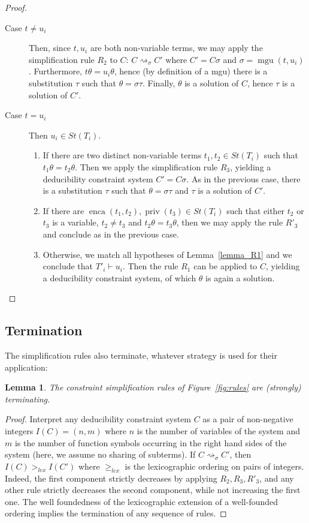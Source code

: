 \documentclass[acmtocl,acmnow]{acmtrans2m}
\newtheorem{lemma}[theorem]{Lemma}
\newcommand{\mgu}{\operatorname{mgu}}
\newcommand{\st}{\mathit{St}}
\newcommand{\enca}{\operatorname{enca}}
\newcommand{\priv}{\operatorname{priv}}
\newcommand{\simpl}{\rightsquigarrow}   \newcommand{\msimpl}{\rightsquigarrow}  \newcommand{\gsimpl}{\leadsto}
\newcommand{\dedsys}[1]{deducibility constraint system}
\begin{document}
\begin{proof}
\begin{description}
\begin{description}
\item[Case $t\neq u_i$] Then, since $t,u_i$ are both non-variable terms,
 we may apply the simplification rule $R_2$ to $C$: $C \simpl_\sigma C'$
where $C'=C\sigma$ and $\sigma = \mgu(t,u_i)$. Furthermore, $t\theta = u_i\theta$, hence (by definition of a mgu) there is a substitution $\tau$ such that
$\theta = \sigma\tau$. Finally, $\theta$ is a solution of $C$, hence $\tau$ is
a solution of $C'$.
\item[Case $t=u_i$] Then $u_i\in \st(T_i)$. 
\begin{enumerate}
\item\label{case_R3} If there are two distinct non-variable terms $t_1, t_2\in \st(T_i)$ such that
$t_1\theta=t_2\theta$. Then we
apply the simplification rule $R_3$, yielding a \dedsys{} $C'=C\sigma$.
As in the previous case, there is a substitution $\tau$ such that $\theta=\sigma\tau$ and $\tau$ is a solution of $C'$.
\item If there are $\enca(t_1,t_2), \priv(t_3)\in \st(T_i)$ such that
either $t_2$ or $t_3$ is a variable, $t_2\neq t_3$ and $t_2\theta=t_3\theta$,
then we may apply the rule $R'_3$ and conclude as in the previous case.
\item Otherwise, 
we match all hypotheses of Lemma~\ref{lemma_R1} and we conclude
that $T'_i \vdash u_i$. Then the rule $R_1$ can be applied to $C$,
yielding a \dedsys{}, of which $\theta$ is again a solution.
\end{enumerate}
\end{description}
\end{description}
\end{proof}

\subsection{Termination}
\label{section:termination}


The simplification rules also terminate, whatever strategy is used for
their application:
\begin{lemma}\label{lemma:termination}
The constraint simplification rules of Figure~\ref{fig:rules} are (strongly)
terminating.
\end{lemma}

\begin{proof}
Interpret any \dedsys{} $C$ as a pair of non-negative integers
$I(C)=(n,m)$ where $n$ is the number of variables of the system and $m$ is the
number of function symbols occurring in the right hand sides of the system
(here, we assume no sharing of subterms). 
If $C \simpl_\sigma C'$, then $I(C) >_{lex} I(C')$ where $\geq_{lex}$ is the lexicographic ordering
on pairs of integers. Indeed, the first component strictly decreases by 
applying $R_2,R_3,R'_3$, and any other rule strictly decreases the second
component, while not increasing the first one.
The well foundedness of the lexicographic extension of a well-founded
ordering implies the termination of any sequence of rules. 
\end{proof}
\end{document}
